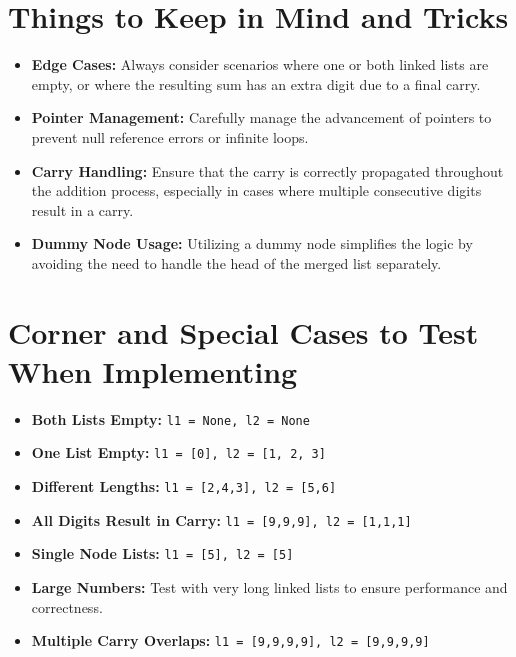 \section*{Things to Keep in Mind and Tricks}
\begin{itemize}
    \item \textbf{Edge Cases:} Always consider scenarios where one or both linked lists are empty, or where the resulting sum has an extra digit due to a final carry.
    \item \textbf{Pointer Management:} Carefully manage the advancement of pointers to prevent null reference errors or infinite loops.
    \item \textbf{Carry Handling:} Ensure that the carry is correctly propagated throughout the addition process, especially in cases where multiple consecutive digits result in a carry.
    \item \textbf{Dummy Node Usage:} Utilizing a dummy node simplifies the logic by avoiding the need to handle the head of the merged list separately.
\end{itemize}

\section*{Corner and Special Cases to Test When Implementing}
\begin{itemize}
    \item \textbf{Both Lists Empty:} \texttt{l1 = None, l2 = None}
    \item \textbf{One List Empty:} \texttt{l1 = [0], l2 = [1, 2, 3]}
    \item \textbf{Different Lengths:} \texttt{l1 = [2,4,3], l2 = [5,6]}
    \item \textbf{All Digits Result in Carry:} \texttt{l1 = [9,9,9], l2 = [1,1,1]}
    \item \textbf{Single Node Lists:} \texttt{l1 = [5], l2 = [5]}
    \item \textbf{Large Numbers:} Test with very long linked lists to ensure performance and correctness.
    \item \textbf{Multiple Carry Overlaps:} \texttt{l1 = [9,9,9,9], l2 = [9,9,9,9]}
\end{itemize}

\printindex